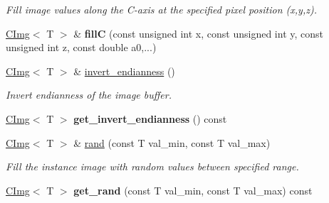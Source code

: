 \begin{DoxyCompactItemize}
\begin{DoxyCompactList}\small\item\em Fill image values along the C-\/axis at the specified pixel position (x,y,z). \item\end{DoxyCompactList}\item 
\hypertarget{structcimg__library_1_1CImg_a13bc530131a503fc6ad3bb8e0a6730eb}{
\hyperlink{structcimg__library_1_1CImg}{CImg}$<$ T $>$ \& {\bfseries fillC} (const unsigned int x, const unsigned int y, const unsigned int z, const double a0,...)}
\label{structcimg__library_1_1CImg_a13bc530131a503fc6ad3bb8e0a6730eb}

\item 
\hypertarget{structcimg__library_1_1CImg_ad1bdd0c686ccaa6a12ff4b69efa5a567}{
\hyperlink{structcimg__library_1_1CImg}{CImg}$<$ T $>$ \& \hyperlink{structcimg__library_1_1CImg_ad1bdd0c686ccaa6a12ff4b69efa5a567}{invert\_\-endianness} ()}
\label{structcimg__library_1_1CImg_ad1bdd0c686ccaa6a12ff4b69efa5a567}

\begin{DoxyCompactList}\small\item\em Invert endianness of the image buffer. \item\end{DoxyCompactList}\item 
\hypertarget{structcimg__library_1_1CImg_af19eb9300a3c12c36c80da939062162b}{
\hyperlink{structcimg__library_1_1CImg}{CImg}$<$ T $>$ {\bfseries get\_\-invert\_\-endianness} () const }
\label{structcimg__library_1_1CImg_af19eb9300a3c12c36c80da939062162b}

\item 
\hypertarget{structcimg__library_1_1CImg_abc7e3023df86263a49a224317c819779}{
\hyperlink{structcimg__library_1_1CImg}{CImg}$<$ T $>$ \& \hyperlink{structcimg__library_1_1CImg_abc7e3023df86263a49a224317c819779}{rand} (const T val\_\-min, const T val\_\-max)}
\label{structcimg__library_1_1CImg_abc7e3023df86263a49a224317c819779}

\begin{DoxyCompactList}\small\item\em Fill the instance image with random values between specified range. \item\end{DoxyCompactList}\item 
\hypertarget{structcimg__library_1_1CImg_aa495c3b165a377b91f0da3483d19177f}{
\hyperlink{structcimg__library_1_1CImg}{CImg}$<$ T $>$ {\bfseries get\_\-rand} (const T val\_\-min, const T val\_\-max) const }
\label{structcimg__library_1_1CImg_aa495c3b165a377b91f0da3483d19177f}


\end{DoxyCompactItemize}
